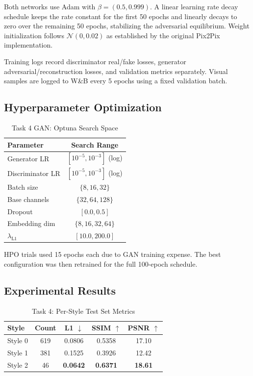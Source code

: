 \documentclass[conference]{IEEEtran}
\begin{document}
Both networks use Adam with $\beta = (0.5, 0.999)$. A linear learning rate decay schedule keeps the rate constant for the first 50 epochs and linearly decays to zero over the remaining 50 epochs, stabilizing the adversarial equilibrium. Weight initialization follows $\mathcal{N}(0, 0.02)$ as established by the original Pix2Pix implementation.

Training logs record discriminator real/fake losses, generator adversarial/reconstruction losses, and validation metrics separately. Visual samples are logged to W\&B every 5 epochs using a fixed validation batch.

\subsection{Hyperparameter Optimization}

\begin{table}[H]
\centering
\caption{Task 4 GAN: Optuna Search Space}
\label{tab:task4_hpo}
\begin{tabular}{lc}
\toprule
\textbf{Parameter} & \textbf{Search Range} \\
\midrule
Generator LR & $[10^{-5}, 10^{-3}]$ (log) \\
Discriminator LR & $[10^{-5}, 10^{-3}]$ (log) \\
Batch size & $\{8, 16, 32\}$ \\
Base channels & $\{32, 64, 128\}$ \\
Dropout & $[0.0, 0.5]$ \\
Embedding dim & $\{8, 16, 32, 64\}$ \\
$\lambda_{\text{L1}}$ & $[10.0, 200.0]$ \\
\bottomrule
\end{tabular}
\end{table}

HPO trials used 15 epochs each due to GAN training expense. The best configuration was then retrained for the full 100-epoch schedule.

\subsection{Experimental Results}

\begin{table}[H]
\centering
\caption{Task 4: Per-Style Test Set Metrics}
\label{tab:task4_results}
\begin{tabular}{lcccc}
\toprule
\textbf{Style} & \textbf{Count} & \textbf{L1 $\downarrow$} & \textbf{SSIM $\uparrow$} & \textbf{PSNR $\uparrow$} \\
\midrule
Style 0 & 619 & 0.0806 & 0.5358 & 17.10 \\
Style 1 & 381 & 0.1525 & 0.3926 & 12.42 \\
Style 2 & 46 & \textbf{0.0642} & \textbf{0.6371} & \textbf{18.61} \\
\bottomrule
\end{tabular}
\end{table}
\end{document}
